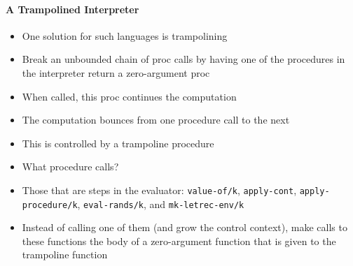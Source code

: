 \documentclass{beamer}
\begin{document}
\begin{frame}[fragile]
\framesubtitle{A Trampolined Interpreter}
\begin{scriptsize}
\begin{itemize}
\item<1-> One solution for such languages is trampolining

\item<1-> Break an unbounded chain of proc calls by having one of the procedures in the interpreter return a zero-argument proc

\item<1-> When called, this proc continues the computation

\item<1-> The computation bounces from one procedure call to the next

\item<1-> This is controlled by a trampoline procedure

\item<2-> What procedure calls?

\item<3-> Those that are steps in the evaluator: \texttt{value-of/k}, \texttt{apply-cont}, \texttt{apply-procedure/k}, \texttt{eval-rands/k}, and \texttt{mk-letrec-env/k}

\item<3-> Instead of calling one of them (and grow the control context), make calls to these functions the body of a zero-argument function that is given to the trampoline function

\end{itemize}
\end{scriptsize}
\end{frame}
\end{document}
